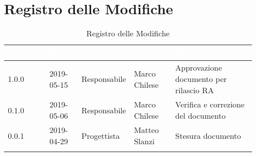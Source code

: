 \newpage

\section*{Registro delle Modifiche}

\begin{center}
\begin{longtable}[c]{|m{}|m{}|m{}|m{}|p{}|}
\hline
\rowcolor{bluelogo}\textbf{\textcolor{white}{Versione}} & \textbf{\textcolor{white}{Data}} & \textbf{\textcolor{white}{Ruolo}} & \textbf{\textcolor{white}{Autore}} & \textbf{\textcolor{white}{Descrizione}}\\
\hline \hline
\endfirsthead

1.0.0 & 2019-05-15 & Responsabile & Marco Chilese & Approvazione documento per rilascio RA  \\
\hline
\rowcolor{grigio} 0.1.0 & 2019-05-06 & Responsabile & Marco Chilese & Verifica e correzione del documento\\
\hline
0.0.1 & 2019-04-29 & Progettista & Matteo Slanzi & Stesura documento \\
\hline
\caption{Registro delle Modifiche}
\end{longtable}
\end{center}
